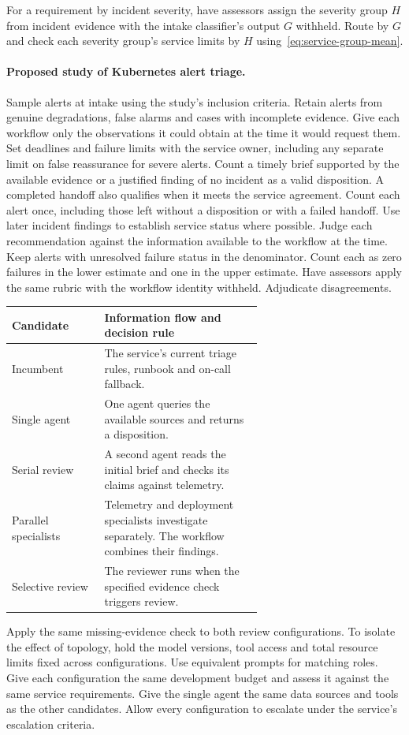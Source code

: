 \documentclass[11pt,reqno]{amsart}
\theoremstyle{definition}
\theoremstyle{remark}
\begin{document}
For a requirement by incident severity, have assessors assign the severity group $H$ from incident evidence with the intake classifier's output $G$ withheld. Route by $G$ and check each severity group's service limits by $H$ using~\eqref{eq:service-group-mean}.

\paragraph{Proposed study of Kubernetes alert triage.}
Sample alerts at intake using the study's inclusion criteria. Retain alerts from genuine degradations, false alarms and cases with incomplete evidence.
Give each workflow only the observations it could obtain at the time it would request them.
Set deadlines and failure limits with the service owner, including any separate limit on false reassurance for severe alerts.
Count a timely brief supported by the available evidence or a justified finding of no incident as a valid disposition. A completed handoff also qualifies when it meets the service agreement.
Count each alert once, including those left without a disposition or with a failed handoff.
Use later incident findings to establish service status where possible. Judge each recommendation against the information available to the workflow at the time. Keep alerts with unresolved failure status in the denominator. Count each as zero failures in the lower estimate and one in the upper estimate.
Have assessors apply the same rubric with the workflow identity withheld. Adjudicate disagreements.

\begin{center}
\small
\begin{tabular}{@{}lp{0.63\linewidth}@{}}
\toprule
Candidate & Information flow and decision rule \\
\midrule
Incumbent & The service's current triage rules, runbook and on-call fallback. \\
Single agent & One agent queries the available sources and returns a disposition. \\
Serial review & A second agent reads the initial brief and checks its claims against telemetry. \\
Parallel specialists & Telemetry and deployment specialists investigate separately. The workflow combines their findings. \\
Selective review & The reviewer runs when the specified evidence check triggers review. \\
\bottomrule
\end{tabular}
\end{center}
Apply the same missing-evidence check to both review configurations.
To isolate the effect of topology, hold the model versions, tool access and total resource limits fixed across configurations. Use equivalent prompts for matching roles.
Give each configuration the same development budget and assess it against the same service requirements.
Give the single agent the same data sources and tools as the other candidates. Allow every configuration to escalate under the service's escalation criteria.
\end{document}
